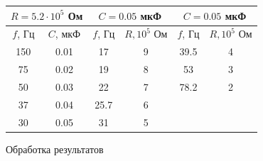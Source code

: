 \documentclass[a4paper, 12pt]{article}
\begin{document}
\begin{enumerate}
        \begin{tabular}{|c|c|c|c|c|c|}
            \hline
            \multicolumn{2}{|c|}{$R = 5.2 \cdot 10^5$ Ом} & \multicolumn{2}{|c|}{$C = 0.05$ мкФ} & \multicolumn{2}{|c|}{$C = 0.05$ мкФ}\\ \hline
            $f$, Гц & $C$, мкФ & $f$, Гц & $R, 10^5$ Ом & $f$, Гц & $R, 10^5$ Ом \\ \hline
            150 & 0.01 & 17 & 9 & 39.5 & 4\\ \hline
            75 & 0.02 & 19 & 8 & 53 & 3\\ \hline
            50 & 0.03 & 22 & 7 & 78.2 & 2\\ \hline
            37 & 0.04 & 25.7 & 6 & & \\ \hline
            30 & 0.05 & 31 & 5 & & \\ \hline
        \end{tabular}
    \end{enumerate}

    \begin{center}
        Обработка результатов
    \end{center}
\end{document}
